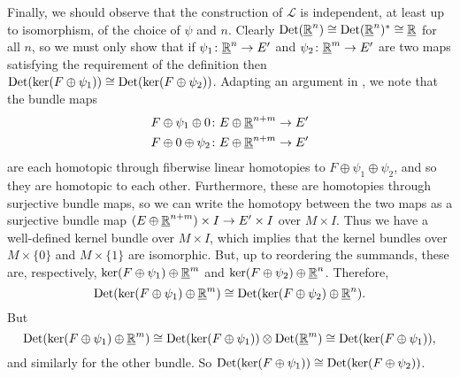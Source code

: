 Finally, we should observe that the construction of $\mathscr L$ is independent, at least up to isomorphism, of the choice of $\psi$ and $n$.
Clearly ${\rm Det}(\underline{\mathbb{R}}^n) \cong {\rm Det}(\underline{\mathbb{R}}^n)^* \cong \underline{\mathbb{R}}$ for all $n$, so we must only show that if $\psi_1 \colon \underline{\mathbb{R}}^n \to E'$ and $\psi_2 \colon \underline{\mathbb{R}}^m \to E'$ are two maps satisfying the requirement of the definition then ${\rm Det}(\ker(F \oplus \psi_1)) \cong {\rm Det}(\ker(F \oplus \psi_2))$.
Adapting an argument in \cite[Section 5.1.3]{DoKr90}, we note that the bundle maps
\begin{align*}
	F \oplus \psi_1 \oplus 0 \colon &E \oplus \underline{\mathbb{R}}^{n+m} \to E'\\
	F \oplus 0 \oplus \psi_2 \colon &E \oplus \underline{\mathbb{R}}^{n+m} \to E'
\end{align*}
are each homotopic through fiberwise linear homotopies to $F \oplus \psi_1 \oplus \psi_2$, and so they are homotopic to each other.
Furthermore, these are homotopies through surjective bundle maps, so we can write the homotopy between the two maps as a surjective bundle map $(E \oplus \underline{\mathbb{R}}^{n+m}) \times I \to E' \times I$ over $M \times I$.
Thus we have a well-defined kernel bundle over $M \times I$, which implies that the kernel bundles over $M \times \{0\}$ and $M \times \{1\}$ are isomorphic.
But, up to reordering the summands, these are, respectively, $\ker(F \oplus \psi_1) \oplus \underline{\mathbb{R}}^m$ and $\ker(F \oplus \psi_2) \oplus \underline{\mathbb{R}}^n$.
Therefore,
$${\rm Det}(\ker(F \oplus \psi_1) \oplus \underline{\mathbb{R}}^m) \cong {\rm Det}(\ker(F \oplus \psi_2) \oplus \underline{\mathbb{R}}^n).$$
But
$${\rm Det}(\ker(F \oplus \psi_1) \oplus \underline{\mathbb{R}}^m) \cong {\rm Det}(\ker(F \oplus \psi_1)) \otimes {\rm Det}(\underline{\mathbb{R}}^m) \cong {\rm Det}(\ker(F \oplus \psi_1)),$$
and similarly for the other bundle.
So ${\rm Det}(\ker(F \oplus \psi_1)) \cong {\rm Det}(\ker(F \oplus \psi_2))$.